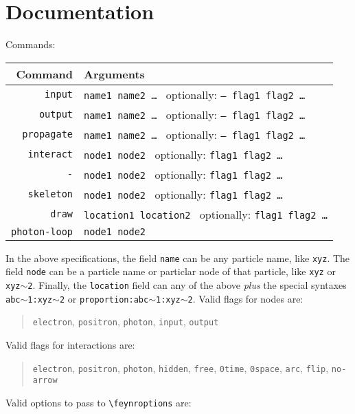 \documentclass[12pt]{article}
\begin{document}
\section*{Documentation}
Commands:
\begin{center}
\begin{tabular}{r|l}
	Command & Arguments \\\hline
	\texttt{input} & \texttt{name1 name2 \dots} \ optionally: \texttt{-- flag1 flag2 \dots} \\
	\texttt{output} & \texttt{name1 name2 \dots} \ optionally: \texttt{-- flag1 flag2 \dots} \\
	\texttt{propagate} & \texttt{name1 name2 \dots} \ optionally: \texttt{-- flag1 flag2 \dots} \\
	\texttt{interact} & \texttt{node1 node2} \ optionally: \texttt{flag1 flag2 \dots} \\
	\texttt{-} & \texttt{node1 node2} \ optionally: \texttt{flag1 flag2 \dots} \\
	\texttt{skeleton} & \texttt{node1 node2} \ optionally: \texttt{flag1 flag2 \dots} \\
	\texttt{draw} & \texttt{location1 location2} \ optionally: \texttt{flag1 flag2 \dots} \\
	\texttt{photon-loop} & \texttt{node1 node2}
\end{tabular}
\end{center}
In the above specifications, the field \texttt{name} can be any particle name, like \texttt{xyz}.
The field \texttt{node} can be a particle name or particlar node of that particle, like \texttt{xyz} or \texttt{xyz$\sim$2}.
Finally, the \texttt{location} field can any of the above \emph{plus} the special syntaxes \texttt{abc$\sim$1:xyz$\sim$2} or \texttt{proportion:abc$\sim$1:xyz$\sim$2}.
Valid flags for nodes are:
\begin{quote}
\texttt{electron}, \texttt{positron}, \texttt{photon}, \texttt{input}, \texttt{output}
\end{quote}
Valid flags for interactions are:
\begin{quote}
\texttt{electron}, \texttt{positron}, \texttt{photon}, \texttt{hidden}, \texttt{free}, \texttt{0time}, \texttt{0space}, \texttt{arc}, \texttt{flip}, \texttt{no-arrow}
\end{quote}
Valid options to pass to \texttt{\textbackslash{}feynroptions} are:
\end{document}
